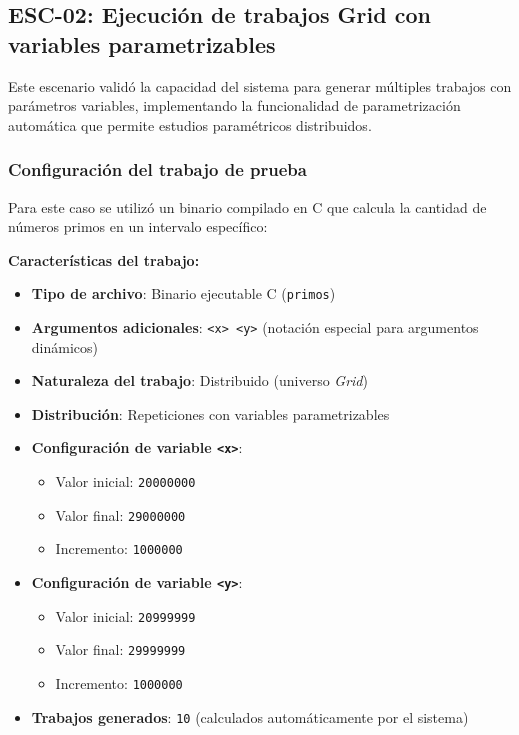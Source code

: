 \subsection{ESC-02: Ejecución de trabajos Grid con variables parametrizables}
\noindent

Este escenario validó la capacidad del sistema para generar múltiples trabajos con parámetros variables, implementando la funcionalidad de parametrización automática que permite estudios paramétricos distribuidos.

\subsubsection{Configuración del trabajo de prueba}
\noindent

Para este caso se utilizó un binario compilado en C que calcula la cantidad de números primos en un intervalo específico:

\textbf{Características del trabajo:}
\begin{itemize}
	\item \textbf{Tipo de archivo}: Binario ejecutable C (\texttt{primos})
	\item \textbf{Argumentos adicionales}: \texttt{<x> <y>} (notación especial para argumentos dinámicos)
	\item \textbf{Naturaleza del trabajo}: Distribuido (universo \textit{Grid})
	\item \textbf{Distribución}: Repeticiones con variables parametrizables
	\item \textbf{Configuración de variable \texttt{<x>}}:
	      \begin{itemize}
		      \item Valor inicial: \texttt{20000000}
		      \item Valor final: \texttt{29000000}
		      \item Incremento: \texttt{1000000}
	      \end{itemize}
	\item \textbf{Configuración de variable \texttt{<y>}}:
	      \begin{itemize}
		      \item Valor inicial: \texttt{20999999}
		      \item Valor final: \texttt{29999999}
		      \item Incremento: \texttt{1000000}
	      \end{itemize}
	\item \textbf{Trabajos generados}: \texttt{10} (calculados automáticamente por el sistema)
\end{itemize}

